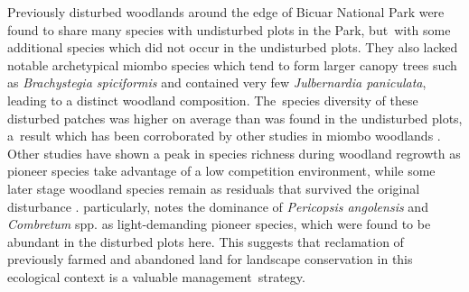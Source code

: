 \documentclass[diversity,article,accept,moreauthors,pdftex]{Definitions/mdpi}
\begin{document}
Previously disturbed woodlands around the edge of Bicuar National Park were found to share many species with undisturbed plots in the Park, but~with some additional species which did not occur in the undisturbed plots. They also lacked notable archetypical miombo species which tend to form larger canopy trees such as \textit{Brachystegia spiciformis} and contained very few \textit{Julbernardia paniculata}, leading to a distinct woodland composition. The~species diversity of these disturbed patches was higher on average than was found in the undisturbed plots, a~result which has been corroborated by other studies in miombo woodlands \citep{Caro2001, McNicol2018b, Shackleton2000}. Other studies have shown a peak in species richness during woodland regrowth as pioneer species take advantage of a low competition environment, while some later stage woodland species remain as residuals that survived the original disturbance \citep{Goncalves2017, Kalaba2013}. \citet{Goncalves2017} particularly, notes the dominance of \textit{Pericopsis angolensis} and \textit{Combretum} spp. as light-demanding pioneer species, which were found to be abundant in the disturbed plots here. This suggests that reclamation of previously farmed and abandoned land for landscape conservation in this ecological context is a valuable management~strategy.
\end{document}
